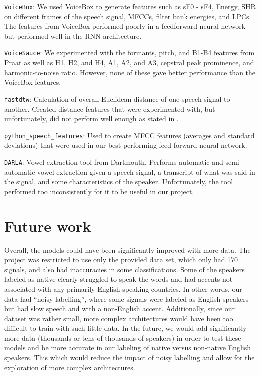 \documentclass{article}
\begin{document}
\texttt{VoiceBox}: We used VoiceBox to generate features such as sF0 - sF4, Energy, SHR on different frames of the speech signal, MFCCs, filter bank energies, and LPCs.
The features from VoiceBox performed poorly in a  feedforward neural network but performed well in the RNN architecture.

\texttt{VoiceSauce}: We experimented with the formants, pitch, and B1-B4 features from Praat as well as H1, H2, and H4, A1, A2, and A3, cepstral peak prominence, and harmonic-to-noise ratio.
However, none of these gave better performance than the VoiceBox features.

\texttt{fastdtw}: Calculation of overall Euclidean distance of one speech signal to another.
Created distance features that were experimented with, but unfortunately, did not perform well enough as stated in .

\texttt{python\_speech\_features}: Used to create MFCC features (averages and standard deviations) that were used in our best-performing feed-forward neural network.

\texttt{DARLA}: Vowel extraction tool from Dartmouth.
Performs automatic and semi-automatic vowel extraction given a speech signal, a transcript of what was said in the signal, and some characteristics of the speaker.
Unfortunately, the tool performed too inconsistently for it to be useful in our project.

\section{Future work}
\label{sec:future}

Overall, the models could have been significantly improved with more data.
The project was restricted to use only the provided data set, which only had 170 signals, and also had inaccuracies in some classifications.
Some of the speakers labeled as native clearly struggled to speak the words and had accents not associated with any primarily English-speaking countries.
In other words, our data had “noisy-labelling”, where some signals were labeled as English speakers but had slow speech and with a non-English accent.
Additionally, since our dataset was rather small, more complex architectures would have been too difficult to train with such little data.
In the future, we would add significantly more data (thousands or tens of thousands of speakers) in order to test these models  and be more accurate in our labeling of native versus non-native English speakers.
This which would reduce the impact of noisy labelling and allow for the exploration of more complex architectures.
\end{document}
